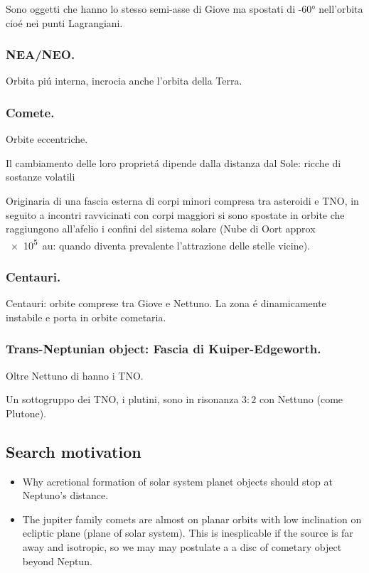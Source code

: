 Sono oggetti che hanno lo stesso semi-asse di Giove ma spostati di \ang{+-60} nell'orbita cio\'e nei punti Lagrangiani.

\subsubsection{NEA/NEO.}

Orbita pi\'u interna, incrocia anche l'orbita della Terra.

\subsubsection{Comete.}
Orbite eccentriche.

Il cambiamento delle loro propriet\'a dipende dalla distanza dal Sole: ricche di sostanze volatili

Originaria di una fascia esterna di corpi minori compresa tra asteroidi e TNO, in seguito a incontri ravvicinati con corpi maggiori si sono spostate in orbite che raggiungono all'afelio i confini del sistema solare (Nube di Oort approx \SI{e5}{\astronomicalunit}: quando diventa prevalente l'attrazione delle stelle vicine).

\subsubsection{Centauri.}

Centauri: orbite comprese tra Giove e Nettuno. La zona \'e dinamicamente instabile e porta in orbite cometaria.

\subsubsection{Trans-Neptunian object: Fascia di Kuiper-Edgeworth.}

Oltre Nettuno di hanno i TNO.

Un sottogruppo dei TNO, i plutini, sono in risonanza $3:2$ con Nettuno (come Plutone).

\subsection{Search motivation}

\begin{itemize}
\item Why acretional formation of solar system planet objects should stop at Neptuno's distance.
\item The jupiter family comets are almost on planar orbits with low inclination on ecliptic plane (plane of solar system). This is inesplicable if the source is far away and isotropic, so we may may postulate a a disc of cometary object beyond Neptun.
\end{itemize}

